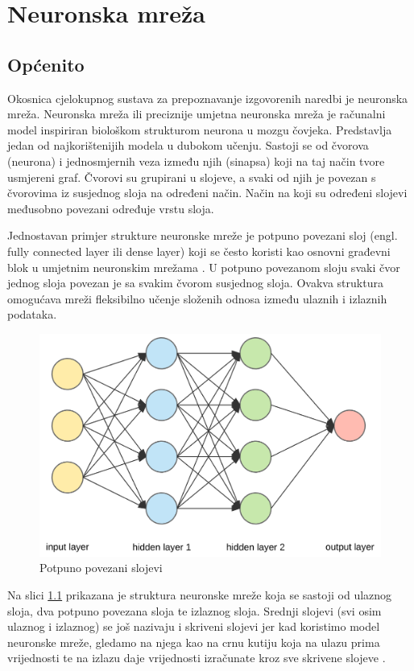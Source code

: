\chapter{Neuronska mreža}
\label{pog:neuronska_mreza}

\section{Općenito}

Okosnica cjelokupnog sustava za prepoznavanje izgovorenih naredbi je neuronska mreža.
Neuronska mreža ili preciznije umjetna neuronska mreža je računalni model inspiriran
biološkom strukturom neurona u mozgu čovjeka. Predstavlja jedan od najkorištenijih modela 
u dubokom učenju. Sastoji se od čvorova (neurona) i jednosmjernih
veza između njih (sinapsa) koji na taj način tvore usmjereni graf. Čvorovi su grupirani u slojeve,
a svaki od njih je povezan s čvorovima iz susjednog sloja na određeni način. Način na koji su
određeni slojevi međusobno povezani određuje vrstu sloja. 

Jednostavan primjer strukture neuronske mreže je potpuno povezani sloj (engl. fully connected layer
ili dense layer) koji se često koristi kao osnovni građevni blok u umjetnim neuronskim mrežama \cite{dense}.
U potpuno povezanom sloju svaki čvor jednog sloja povezan je sa svakim čvorom susjednog sloja.
Ovakva struktura omogućava mreži fleksibilno učenje složenih odnosa između ulaznih i izlaznih podataka.

\begin{figure}[htb]
  \centering
  \includegraphics[width=0.5\linewidth]{Chapters/neuronska_mreza/dense_layer.png} 
  \caption{Potpuno povezani slojevi \cite{dense}}
  \label{pic:dense_layer}
\end{figure}

Na slici \ref{pic:dense_layer} prikazana je struktura neuronske mreže koja se sastoji od ulaznog sloja,
dva potpuno povezana sloja te izlaznog sloja. Srednji slojevi (svi osim ulaznog i izlaznog)
se još nazivaju i skriveni slojevi jer kad koristimo model neuronske mreže, gledamo
na njega kao na crnu kutiju koja na ulazu prima vrijednosti te na izlazu daje vrijednosti
izračunate kroz sve skrivene slojeve \cite{fully_connected}.

